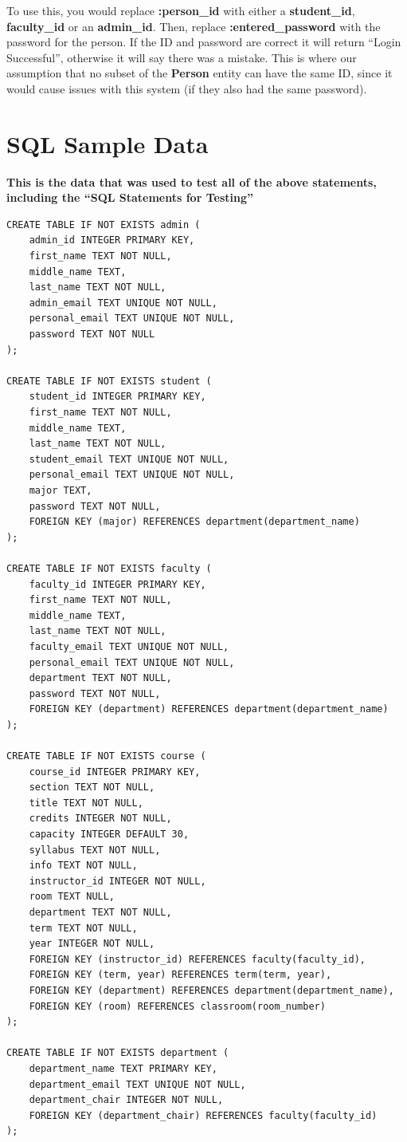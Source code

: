 \documentclass{report}
\newcommand{\uchapter}[1]{\chapter*{#1}
\addcontentsline{toc}{chapter}{\protect\numberline{}#1}}
\begin{document}
To use this, you would replace \textbf{:person\_id} with either a \textbf{student\_id}, \textbf{faculty\_id} or an \textbf{admin\_id}. Then, replace \textbf{:entered\_password} with the password for the person. If the ID and password are correct it will return ``Login Successful'', otherwise it will say there was a mistake. This is where our assumption that no subset of the \textbf{Person} entity can have the same ID, since it would cause issues with this system (if they also had the same password).

\uchapter{SQL Sample Data}

\textbf{This is the data that was used to test all of the above statements, including the ``SQL Statements for Testing''}

\begin{lstlisting}
CREATE TABLE IF NOT EXISTS admin (
    admin_id INTEGER PRIMARY KEY,
    first_name TEXT NOT NULL,
    middle_name TEXT,
    last_name TEXT NOT NULL,
    admin_email TEXT UNIQUE NOT NULL,
    personal_email TEXT UNIQUE NOT NULL,
    password TEXT NOT NULL
);

CREATE TABLE IF NOT EXISTS student (
    student_id INTEGER PRIMARY KEY,
    first_name TEXT NOT NULL,
    middle_name TEXT,
    last_name TEXT NOT NULL,
    student_email TEXT UNIQUE NOT NULL,
    personal_email TEXT UNIQUE NOT NULL,
    major TEXT,
    password TEXT NOT NULL,
    FOREIGN KEY (major) REFERENCES department(department_name)
);

CREATE TABLE IF NOT EXISTS faculty (
    faculty_id INTEGER PRIMARY KEY,
    first_name TEXT NOT NULL,
    middle_name TEXT,
    last_name TEXT NOT NULL,
    faculty_email TEXT UNIQUE NOT NULL,
    personal_email TEXT UNIQUE NOT NULL,
    department TEXT NOT NULL,
    password TEXT NOT NULL,
    FOREIGN KEY (department) REFERENCES department(department_name)
);

CREATE TABLE IF NOT EXISTS course (
    course_id INTEGER PRIMARY KEY,
    section TEXT NOT NULL,
    title TEXT NOT NULL,
    credits INTEGER NOT NULL,
    capacity INTEGER DEFAULT 30,
    syllabus TEXT NOT NULL,
    info TEXT NOT NULL,
    instructor_id INTEGER NOT NULL,
    room TEXT NULL,
    department TEXT NOT NULL,
    term TEXT NOT NULL,
    year INTEGER NOT NULL,
    FOREIGN KEY (instructor_id) REFERENCES faculty(faculty_id),
    FOREIGN KEY (term, year) REFERENCES term(term, year),
    FOREIGN KEY (department) REFERENCES department(department_name),
    FOREIGN KEY (room) REFERENCES classroom(room_number)
);

CREATE TABLE IF NOT EXISTS department (
    department_name TEXT PRIMARY KEY,
    department_email TEXT UNIQUE NOT NULL,
    department_chair INTEGER NOT NULL,
    FOREIGN KEY (department_chair) REFERENCES faculty(faculty_id)
);


\end{lstlisting}
\end{document}
